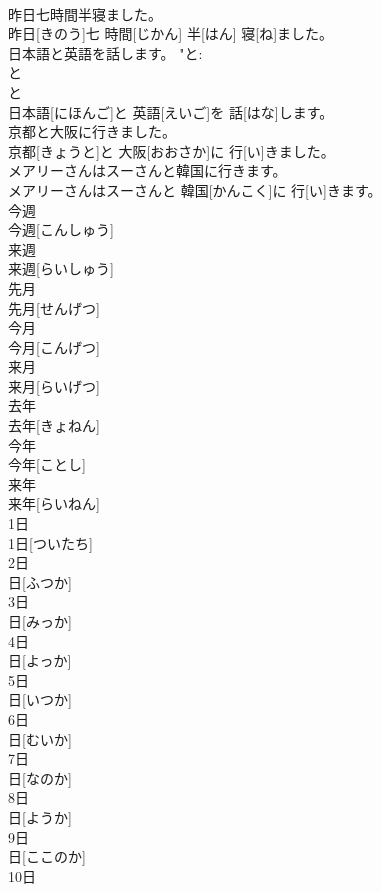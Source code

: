 \documentclass[8pt]{extreport}
\begin{document}
\begin{CJK}{UTF8}{min}
\\	昨日七時間半寝ました。	
\\	昨日[きのう]七 時間[じかん] 半[はん] 寝[ね]ました。	
\\	日本語と英語を話します。	"と: 
\\	と 
\\	と 
\\	日本語[にほんご]と 英語[えいご]を 話[はな]します。	
\\	京都と大阪に行きました。	
\\	京都[きょうと]と 大阪[おおさか]に 行[い]きました。	
\\	メアリーさんはスーさんと韓国に行きます。	
\\	メアリーさんはスーさんと 韓国[かんこく]に 行[い]きます。	
\\	今週	
\\	今週[こんしゅう]		
\\	来週	
\\	来週[らいしゅう]		
\\	先月	
\\	先月[せんげつ]		
\\	今月	
\\	今月[こんげつ]		
\\	来月	
\\	来月[らいげつ]		
\\	去年	
\\	去年[きょねん]		
\\	今年	
\\	今年[ことし]		
\\	来年	
\\	来年[らいねん]		
\\	1日	
\\	1日[ついたち]		
\\	2日	
\\	日[ふつか]		
\\	3日	
\\	日[みっか]		
\\	4日	
\\	日[よっか]		
\\	5日	
\\	日[いつか]		
\\	6日	
\\	日[むいか]		
\\	7日	
\\	日[なのか]		
\\	8日	
\\	日[ようか]		
\\	9日	
\\	日[ここのか]		
\\	10日	

\end{CJK}
\end{document}
